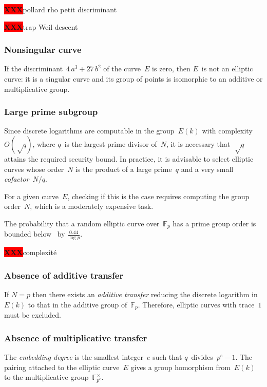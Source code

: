 \documentclass{article}
\def\F{\mathbb{F}}
\def\XXX{{\colorbox{red}{{\color{white}\bfseries XXX}}}}
\begin{document}
\XXX pollard rho petit discriminant

\XXX trap Weil descent

\label{ss:dlp}
\subsubsection{Nonsingular curve}

If the discriminant~$4\, a^3 + 27\,b^2$
of the curve~$E$ is zero, then $E$~is not an elliptic curve:
it is a singular curve and its group of points is isomorphic to
an additive or multiplicative group.

\subsubsection{Large prime subgroup}

Since discrete logarithms are computable in the group~$E(k)$
with complexity~$O(√q)$, where $q$~is the largest prime divisor of~$N$,
it is necessary that~$√q$ attains the required security bound.
In practice, it is advisable to select elliptic curves whose order~$N$
is the product of a large prime~$q$
and a very small \emph{cofactor}~$N/q$.

For a given curve~$E$, checking if this is the case
requires computing the group order~$N$,
which is a moderately expensive task.

The probability that a random elliptic curve over~$\F_p$
has a prime group order is bounded below~\cite{lms2000gm}
by $\frac{0.44}{\log p}$.

\XXX complexité

\subsubsection{Absence of additive transfer}

If $N = p$ then there exists an \emph{additive transfer}
reducing the discrete logarithm in~$E(k)$
to that in the additive group of~$\F_p$.
Therefore, elliptic curves with trace~$1$ must be excluded.

\subsubsection{Absence of multiplicative transfer}

The \emph{embedding degree} is the smallest integer~$e$ such that
$q$~divides~$p^e -1$.
The pairing attached to the elliptic curve~$E$
gives a group homorphism from~$E(k)$
to the multiplicative group~$\F_{p^e}^{×}$.
\end{document}
